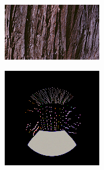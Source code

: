 \begin{figure}[]
\begin{subfigure}{\textwidth}
        \begin{subfigure}{0.19\textwidth}
            \centering
            \includegraphics[width=\textwidth]{images/04-experiment03/ball_wood_target.jpg}
            \caption*{}
        \end{subfigure}
        \hfill
        \begin{subfigure}{0.19\textwidth}
            \centering
            \includegraphics[width=\textwidth]{images/04-experiment03/ball_dof/wood/stats_im.jpg}
            \caption*{}
        \end{subfigure}
        \hfill
        \begin{subfigure}{0.19\textwidth}

\end{subfigure}
\end{subfigure}
\end{figure}
